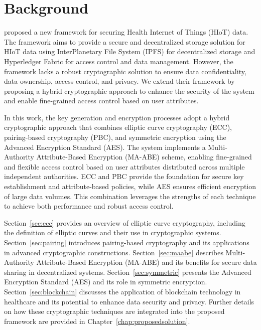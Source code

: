 \documentclass[cic,tc,english]{iiufrgs}
\begin{document}
\chapter{Background}
    \label{chap:background}

    \citet{laura2023} proposed a new framework for securing Health Internet of Things (HIoT) data. The framework aims to provide a secure and decentralized storage solution for HIoT data using InterPlanetary File System (IPFS) \cite{benet2013ipfs} for decentralized storage and Hyperledger Fabric \cite{fabric} for access control and data management. However, the framework lacks a robust cryptographic solution to ensure data confidentiality, data ownership, access control, and privacy. We extend their framework by proposing a hybrid cryptographic approach to enhance the security of the system and enable fine-grained access control based on user attributes.

    In this work, the key generation and encryption processes adopt a hybrid cryptographic approach that combines elliptic curve cryptography (ECC), pairing-based cryptography (PBC), and symmetric encryption using the Advanced Encryption Standard (AES). The system implements a Multi-Authority Attribute-Based Encryption (MA-ABE) scheme, enabling fine-grained and flexible access control based on user attributes distributed across multiple independent authorities. ECC and PBC provide the foundation for secure key establishment and attribute-based policies, while AES ensures efficient encryption of large data volumes. This combination leverages the strengths of each technique to achieve both performance and robust access control.



    Section~\ref{sec:ecc} provides an overview of elliptic curve cryptography, including the definition of elliptic curves and their use in cryptographic systems. Section~\ref{sec:pairing} introduces pairing-based cryptography and its applications in advanced cryptographic constructions. Section~\ref{sec:maabe} describes Multi-Authority Attribute-Based Encryption (MA-ABE) and its benefits for secure data sharing in decentralized systems. Section~\ref{sec:symmetric} presents the Advanced Encryption Standard (AES) and its role in symmetric encryption. Section~\ref{sec:blockchain} discusses the application of blockchain technology in healthcare and its potential to enhance data security and privacy. Further details on how these cryptographic techniques are integrated into the proposed framework are provided in Chapter~\ref{chap:proposedsolution}.
    
\end{document}
